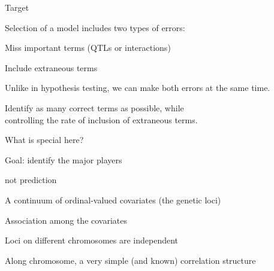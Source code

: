 \documentclass[aspectratio=169,12pt,t]{beamer}
\begin{document}
\begin{frame}{Target}


\bbi

\item Selection of a model includes two types of errors:
\bi
\item Miss important terms (QTLs or interactions)
\item Include extraneous terms
\ei

\item Unlike in hypothesis testing, we can make {\hilit both errors} at
the same time.

\item {\hilit Identify as many correct terms as possible, while \\
{\vhilit controlling the rate of inclusion of extraneous terms}.}
\ei

\note{
}
\end{frame}









\begin{frame}{What is special here?}


\bbi

\item Goal: identify the major players
  \bi
  \item {\vhilit not} prediction
  \ei

\item A continuum of ordinal-valued covariates (the genetic loci)

\item Association among the covariates

\bi
\item Loci on different chromosomes are independent
\item Along chromosome, a very simple (and known) correlation
  structure
\ei

\ei

\note{
}
\end{frame}
\end{document}
